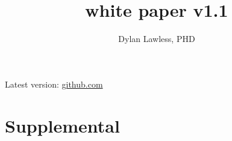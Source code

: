 \documentclass{article}
\newcommand{\whitepaperversion}{white paper v1.1}
\begin{document}
%


\title{\Large \bf \pmu\\
{\whitepaperversion}}
\author[1]{\rm Dylan Lawless, PHD}

\maketitle
\color{kispiblack}
Latest version: \href{https://github.com/DylanLawless/precision_med_group/tree/main/whitepaper_1}{github.com}
\tableofcontents
{} 
\clearpage


\clearpage














\clearpage

\clearpage








\beginsupplement
\section{Supplemental}
\label{sec:Supplemental_text}

\end{document}
